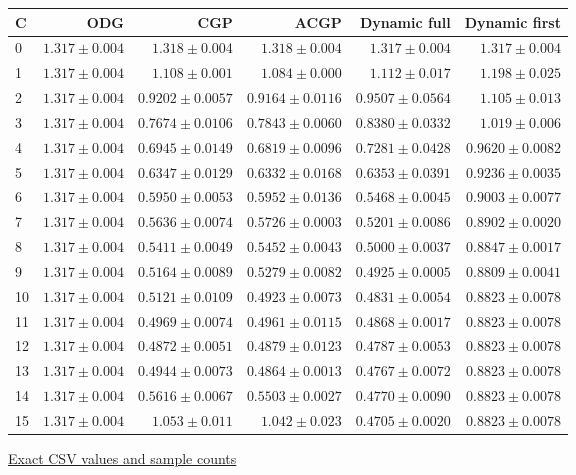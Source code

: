 \begin{center}{\scriptsize\setlength{\tabcolsep}{3pt}
\begin{tabular}{lrrrrr}
\toprule
C & ODG & CGP & ACGP & Dynamic full & Dynamic first \\
\midrule
0 & $1.317\pm0.004$ & $1.318\pm0.004$ & $1.318\pm0.004$ & $1.317\pm0.004$ & $1.317\pm0.004$ \\
1 & $1.317\pm0.004$ & $1.108\pm0.001$ & $1.084\pm0.000$ & $1.112\pm0.017$ & $1.198\pm0.025$ \\
2 & $1.317\pm0.004$ & $0.9202\pm0.0057$ & $0.9164\pm0.0116$ & $0.9507\pm0.0564$ & $1.105\pm0.013$ \\
3 & $1.317\pm0.004$ & $0.7674\pm0.0106$ & $0.7843\pm0.0060$ & $0.8380\pm0.0332$ & $1.019\pm0.006$ \\
4 & $1.317\pm0.004$ & $0.6945\pm0.0149$ & $0.6819\pm0.0096$ & $0.7281\pm0.0428$ & $0.9620\pm0.0082$ \\
5 & $1.317\pm0.004$ & $0.6347\pm0.0129$ & $0.6332\pm0.0168$ & $0.6353\pm0.0391$ & $0.9236\pm0.0035$ \\
6 & $1.317\pm0.004$ & $0.5950\pm0.0053$ & $0.5952\pm0.0136$ & $0.5468\pm0.0045$ & $0.9003\pm0.0077$ \\
7 & $1.317\pm0.004$ & $0.5636\pm0.0074$ & $0.5726\pm0.0003$ & $0.5201\pm0.0086$ & $0.8902\pm0.0020$ \\
8 & $1.317\pm0.004$ & $0.5411\pm0.0049$ & $0.5452\pm0.0043$ & $0.5000\pm0.0037$ & $0.8847\pm0.0017$ \\
9 & $1.317\pm0.004$ & $0.5164\pm0.0089$ & $0.5279\pm0.0082$ & $0.4925\pm0.0005$ & $0.8809\pm0.0041$ \\
10 & $1.317\pm0.004$ & $0.5121\pm0.0109$ & $0.4923\pm0.0073$ & $0.4831\pm0.0054$ & $0.8823\pm0.0078$ \\
11 & $1.317\pm0.004$ & $0.4969\pm0.0074$ & $0.4961\pm0.0115$ & $0.4868\pm0.0017$ & $0.8823\pm0.0078$ \\
12 & $1.317\pm0.004$ & $0.4872\pm0.0051$ & $0.4879\pm0.0123$ & $0.4787\pm0.0053$ & $0.8823\pm0.0078$ \\
13 & $1.317\pm0.004$ & $0.4944\pm0.0073$ & $0.4864\pm0.0013$ & $0.4767\pm0.0072$ & $0.8823\pm0.0078$ \\
14 & $1.317\pm0.004$ & $0.5616\pm0.0067$ & $0.5503\pm0.0027$ & $0.4770\pm0.0090$ & $0.8823\pm0.0078$ \\
15 & $1.317\pm0.004$ & $1.053\pm0.011$ & $1.042\pm0.023$ & $0.4705\pm0.0020$ & $0.8823\pm0.0078$ \\
\bottomrule\end{tabular}}
{\footnotesize\href{https://github.com/sanjeevkrishnaa/Compiler-Driven-ACE/blob/codex/ace-scheduler-correctness/docs/latex/qft96_final/data/allocation_mesh_xy_m16.csv}{Exact CSV values and sample counts}}
\end{center}
